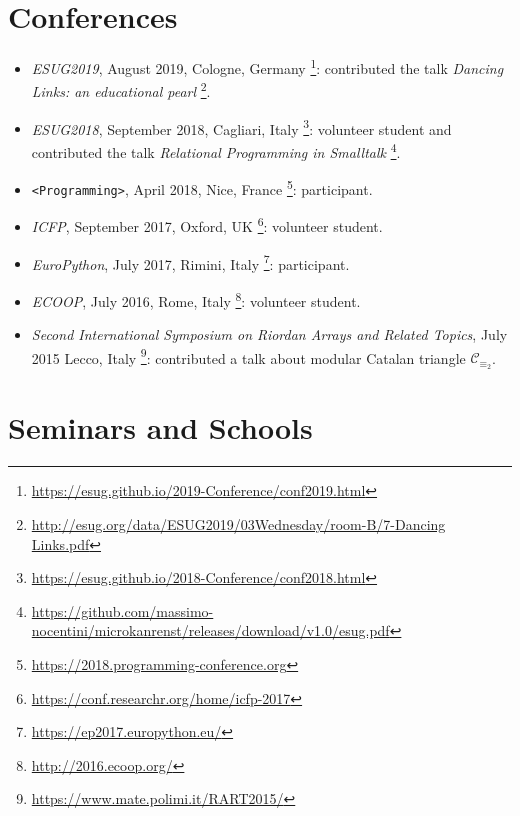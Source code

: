 \documentclass[a4paper]{article} %
\begin{document}
    \section{Conferences}

    \begin{itemize}
        \item \emph{ESUG2019}, August 2019, Cologne, Germany \footnote{\url{https://esug.github.io/2019-Conference/conf2019.html}}: 
		contributed the talk \textit{Dancing Links: an educational pearl} \footnote{\url{http://esug.org/data/ESUG2019/03Wednesday/room-B/7-Dancing Links.pdf}}.
        \item \emph{ESUG2018}, September 2018, Cagliari, Italy \footnote{\url{https://esug.github.io/2018-Conference/conf2018.html}}: volunteer student and
        contributed the talk \textit{Relational Programming in Smalltalk} \footnote{\url{https://github.com/massimo-nocentini/microkanrenst/releases/download/v1.0/esug.pdf}}.
        \item \texttt{<Programming>}, April 2018, Nice, France \footnote{\url{https://2018.programming-conference.org}}: participant.
        \item \emph{ICFP}, September 2017, Oxford, UK \footnote{\url{https://conf.researchr.org/home/icfp-2017}}: volunteer student.
        \item \emph{EuroPython}, July 2017, Rimini, Italy \footnote{\url{https://ep2017.europython.eu/}}: participant.
        \item \emph{ECOOP}, July 2016, Rome, Italy \footnote{\url{http://2016.ecoop.org/}}: volunteer student.
        \item \emph{Second International Symposium on Riordan Arrays and Related Topics}, 
            July 2015 Lecco, Italy \footnote{\url{https://www.mate.polimi.it/RART2015/}}: contributed a talk about modular Catalan triangle $\mathcal{C}_{\equiv_{2}}$.
    \end{itemize}

    \section{Seminars and Schools}
\end{document}
